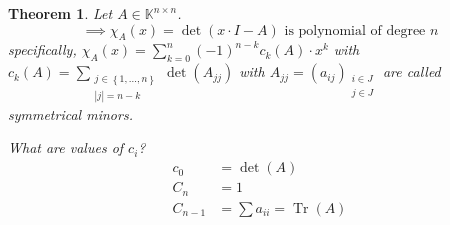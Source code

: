\documentclass{article}
\newcounter{lecref}[section]
\numberwithin{lecref}{section}
\newtheorem{theorem}[lecref]{Theorem}
\newcommand{\set}[1]{\left\{#1\right\}}
\begin{document}
\begin{theorem} %
  Let $A \in \mathbb K^{n \times n}$.
  \[ \implies \chi_A(x) = \det(x \cdot I - A) \text{ is polynomial of degree } n \]
  specifically, $\chi_A(x) = \sum_{k=0}^n (-1)^{n-k} c_k(A) \cdot x^k$ with $c_k(A) = \sum_{\substack{j \in \set{1, \dots, n} \\ |j| = n - k}} \det(A_{jj})$
  with $A_{jj} = (a_{ij})_{\substack{i \in J \\ j \in J}}$ are called \emph{symmetrical minors}.

  What are values of $c_i$?
  \begin{align*}
    c_0 &= \det(A) \\
    C_n &= 1 \\
    C_{n-1} &= \sum a_{ii} = \operatorname{Tr}(A)
  \end{align*}
\end{theorem}
\end{document}
